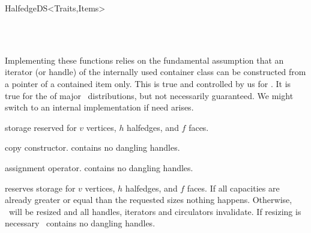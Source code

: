 \begin{ccRefConcept}{HalfedgeDS<Traits,Items>}
\begin{ccAdvanced}
\mbox{}~~~~~~ \\
\mbox{}~~~~~~

Implementing these functions relies on the fundamental assumption that
an iterator (or handle) of the internally used container class can be
constructed from a pointer of a contained item only. This is true and
controlled by us for . It is true for the
 of major \stl\ distributions, but not necessarily 
guaranteed. We might switch to an internal implementation if need
arises.

\ccGlue
{}

\ccGlue
{}

\ccGlue
{}

\end{ccAdvanced}

\ccCreation
{}
\ccThreeToTwo


    {storage reserved for $v$ vertices, $h$ halfedges, and $f$ faces.}

\ccTagDefaults
{}
    {copy constructor. \ccPrecond {} contains no dangling handles.}

    {assignment operator. \ccPrecond {} contains no dangling handles.}

    {reserves storage for $v$ vertices, $h$ halfedges, and $f$ faces.
     If all capacities are already greater or equal than the requested sizes
     nothing happens. Otherwise, \ccVar\ will be resized and all handles, 
     iterators and circulators invalidate. \ccPrecond If resizing is
     necessary \ccVar\ contains no dangling handles.}



\end{ccRefConcept}
